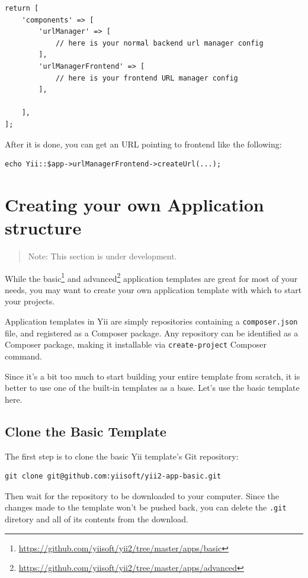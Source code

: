 \lstset{language=php}\begin{lstlisting}
return [
    'components' => [
        'urlManager' => [
            // here is your normal backend url manager config
        ],
        'urlManagerFrontend' => [
            // here is your frontend URL manager config
        ],

    ],
];
\end{lstlisting}
After it is done, you can get an URL pointing to frontend like the following:

\lstset{language=php}\begin{lstlisting}
echo Yii::$app->urlManagerFrontend->createUrl(...);
\end{lstlisting}


\label{tutorial-start-from-scratch.md}\section{Creating your own Application structure}
\begin{quote}Note: This section is under development.

\end{quote}
While the basic\footnote{\url{https://github.com/yiisoft/yii2/tree/master/apps/basic}} and advanced\footnote{\url{https://github.com/yiisoft/yii2/tree/master/apps/advanced}}
application templates are great for most of your needs, you may want to create your own application template with which
to start your projects.

Application templates in Yii are simply repositories containing a \lstinline|composer.json| file, and registered as a Composer package.
Any repository can be identified as a Composer package, making it installable via \lstinline|create-project| Composer command.

Since it's a bit too much to start building your entire template from scratch, it is better to use one of the built-in
templates as a base. Let's use the basic template here.

\subsection{Clone the Basic Template}
The first step is to clone the basic Yii template's Git repository:

\lstset{language=bash}\begin{lstlisting}
git clone git@github.com:yiisoft/yii2-app-basic.git
\end{lstlisting}
Then wait for the repository to be downloaded to your computer. Since the changes made to the template won't be pushed back, you can delete the \lstinline|.git| diretory and all
of its contents from the download.


